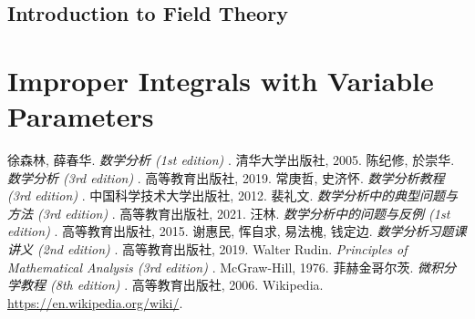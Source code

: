 \documentclass[11pt]{../../TexTemplate/elegantbook}
\begin{document}
\section{Introduction to Field Theory}

\chapter{Improper Integrals with Variable Parameters}




\begin{thebibliography}{99} 
 徐森林, 薛春华. \emph{数学分析 (1st edition) }. 清华大学出版社, 2005.
 陈纪修, 於崇华. \emph{数学分析 (3rd edition) }. 高等教育出版社, 2019.
 常庚哲, 史济怀. \emph{数学分析教程 (3rd edition) }. 中国科学技术大学出版社, 2012.
 裴礼文. \emph{数学分析中的典型问题与方法 (3rd edition) }. 高等教育出版社, 2021.
 汪林. \emph{数学分析中的问题与反例 (1st edition) }. 高等教育出版社, 2015.
 谢惠民, 恽自求, 易法槐, 钱定边. \emph{数学分析习题课讲义 (2nd edition) }. 高等教育出版社, 2019.
 Walter Rudin. \emph{Principles of Mathematical Analysis (3rd edition) }. McGraw-Hill, 1976.
 菲赫金哥尔茨. \emph{微积分学教程 (8th edition) }. 高等教育出版社, 2006.
 Wikipedia. \url{https://en.wikipedia.org/wiki/}.
\end{thebibliography}
\end{document}

